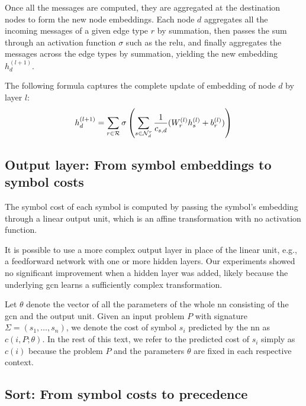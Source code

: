 Once all the messages are computed,
they are aggregated at the destination nodes to form the new node embeddings.
Each node $d$ aggregates all the incoming messages of a given edge type $r$ by summation,
then passes the sum through an activation function $\sigma$ such as the \gls{relu},
and finally aggregates the messages across the edge types by summation,
yielding the new embedding $h_d^{(l+1)}$.

The following formula captures the complete update of embedding of node $d$ by layer $l$:
$$
h_d^{(l+1)} =
\sum_{r \in \mathcal{R}} \sigma \left(\sum_{s \in \mathcal{N}_d^r} \frac{1}{c_{s,d}} (W_r^{(l)} h_s^{(l)} + b_r^{(l)})\right)
$$



\subsection{Output layer: From symbol embeddings to symbol costs}
\label{sec:output}

The symbol cost of each symbol is computed by passing the symbol's embedding through a linear output unit,
which is an affine transformation with no activation function.

It is possible to use a more complex output layer in place of the linear unit,
e.g., a feedforward network with one or more hidden layers.
Our experiments showed no significant improvement when a hidden layer was added,
likely because the underlying \gls{gcn} learns a sufficiently complex transformation.

Let $\theta$ denote the vector of all the parameters of the whole \acrlong{nn} consisting of the \gls{gcn} and the output unit.
Given an input problem $P$ with signature $\Sigma = (s_1, \ldots, s_n)$,
we denote the cost of symbol $s_i$ predicted by the \acrlong{nn} as $c(i, P; \theta)$.
In the rest of this text,
we refer to the predicted cost of $s_i$ simply as $c(i)$
because the problem $P$ and the parameters $\theta$ are fixed in each respective context.

\subsection{Sort: From symbol costs to precedence}
\label{sec:sorting}

